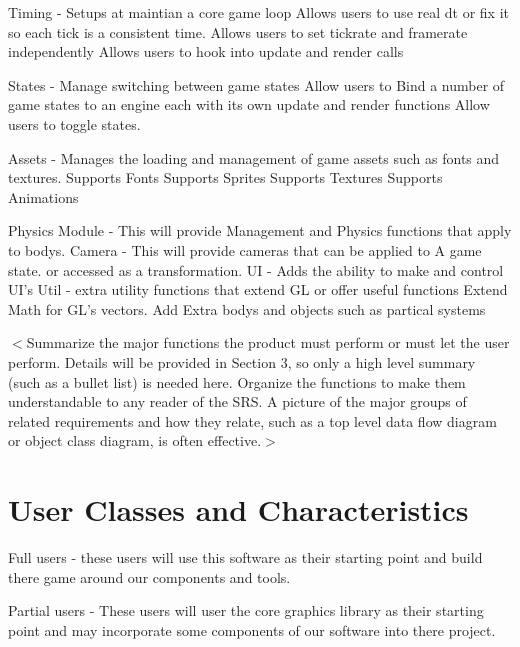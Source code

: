 \documentclass{scrreprt}
\begin{document}
	Timing - Setups at maintian a core game loop
		Allows users to use real dt or fix it so each tick is a consistent time.
		Allows users to set tickrate and framerate independently
		Allows users to hook into update and render calls
		
		
	States - Manage switching between game states
		Allow users to Bind a number of game states to an engine each with its own update and render functions
		Allow users to toggle states.
	
	Assets - Manages the loading and management of game assets such as fonts and textures.  
		Supports Fonts
		Supports Sprites
		Supports Textures
		Supports Animations
	
	
Physics Module - This will provide Management and Physics functions that apply to bodys.
Camera - This will provide cameras that can be applied to A game state. or accessed as a transformation.
UI - Adds the ability to make and control UI's 
Util - extra utility functions that extend GL or offer useful functions
	Extend Math for GL's vectors.
	Add Extra bodys and objects such as partical systems

	
$<$Summarize the major functions the product must perform or must let the user 
perform. Details will be provided in Section 3, so only a high level summary 
(such as a bullet list) is needed here. Organize the functions to make them 
understandable to any reader of the SRS. A picture of the major groups of 
related requirements and how they relate, such as a top level data flow diagram 
or object class diagram, is often effective.$>$

\section{User Classes and Characteristics}

Full users - these users will use this software as their starting point and build there game around our components and tools.

Partial users - These users will user the core graphics library as their starting point and may incorporate some components of our software into there project. 

\end{document}
